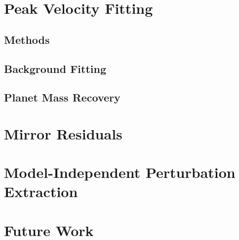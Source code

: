 \section{Peak Velocity Fitting}

\subsection{Methods}

\subsection{Background Fitting}

\subsection{Planet Mass Recovery}

\section{Mirror Residuals}

\section{Model-Independent Perturbation Extraction}

\section{Future Work}